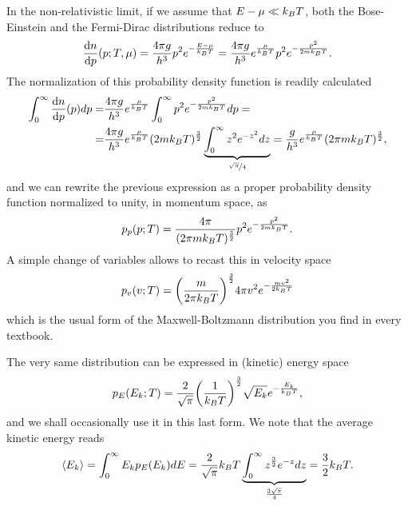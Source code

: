 In the non-relativistic limit, if we assume that $E - \mu \ll k_B T$, both the
Bose-Einstein and the Fermi-Dirac distributions reduce to
\begin{align*}
  \dv{n}{p}{(p; T, \mu)} = \frac{4\pi g}{h^3} p^2 e^{-\frac{E - \mu}{k_B T}} =
  \frac{4\pi g}{h^3} e^{\frac{\mu}{k_B T}} p^2 e^{-\frac{p^2}{2m k_B T}}.
\end{align*}
The normalization of this probability density function is readily calculated
\begin{align*}
  \int_0^\infty \dv{n}{p}{(p)} dp = &
  \frac{4\pi g}{h^3} e^{\frac{\mu}{k_B T}} \int_0^\infty p^2 e^{-\frac{p^2}{2m k_B T}} dp =\\
   = & \frac{4\pi g}{h^3} e^{\frac{\mu}{k_B T}} (2m k_B T)^\frac{3}{2}
   \underbrace{\int_0^\infty z^2 e^{-z^2} dz}_{\nicefrac{\sqrt{\pi}}{4}} =
   \frac{g}{h^3} e^{\frac{\mu}{k_B T}} (2 \pi m k_B T)^\frac{3}{2},
\end{align*}
and we can rewrite the previous expression as a proper probability density function
normalized to unity, in momentum space, as
\begin{align*}
  p_p(p; T) = \frac{4\pi}{(2 \pi m k_B T)^\frac{3}{2}} p^2 e^{-\frac{p^2}{2m k_B T}}.
\end{align*}
A simple change of variables allows to recast this in velocity space
\begin{align}
  p_v(v; T) = \qty(\frac{m}{2\pi k_B T})^\frac{3}{2} 4\pi v^2 e^{-\frac{mv^2}{2k_B T}}
\end{align}
which is the usual form of the Maxwell-Boltzmann distribution you find in every
textbook.

The very same distribution can be expressed in (kinetic) energy space
\begin{align}
  p_E(E_k; T) =
  \frac{2}{\sqrt{\pi}} \qty(\frac{1}{k_B T})^\frac{3}{2} \sqrt{E_k} e^{-\frac{E_k}{k_B T}},
\end{align}
and we shall occasionally use it in this last form. We note that the average kinetic
energy reads
\begin{align}
  \left<E_k\right> = \int_0^\infty E_k p_E(E_k) dE =
  \frac{2}{\sqrt{\pi}} k_B T \underbrace{\int_0^\infty z^\frac{3}{2} e^{-z} dz}_{\frac{3\sqrt{\pi}}{4}} =
  \frac{3}{2} k_B T.
\end{align}



